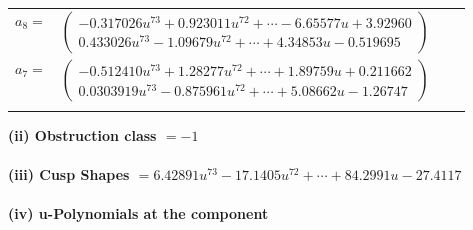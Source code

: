 \documentclass[1p]{elsarticle_modified}
\theoremstyle{definition}
\begin{document}
\begin{tabular}{m{7pt} m{180pt} m{7pt} m{180pt} }
\flushright $a_{8}=$&$\begin{pmatrix}-0.317026 u^{73}+0.923011 u^{72}+\cdots-6.65577 u+3.92960\\0.433026 u^{73}-1.09679 u^{72}+\cdots+4.34853 u-0.519695\end{pmatrix}$ \\
\flushright $a_{7}=$&$\begin{pmatrix}-0.512410 u^{73}+1.28277 u^{72}+\cdots+1.89759 u+0.211662\\0.0303919 u^{73}-0.875961 u^{72}+\cdots+5.08662 u-1.26747\end{pmatrix}$\\&\end{tabular}
\flushleft \textbf{(ii) Obstruction class $= -1$}\\~\\
\flushleft \textbf{(iii) Cusp Shapes $= 6.42891 u^{73}-17.1405 u^{72}+\cdots+84.2991 u-27.4117$}\\~\\
\newpage\renewcommand{\arraystretch}{1}
\flushleft \textbf{(iv) u-Polynomials at the component}\newline \\
\end{document}
